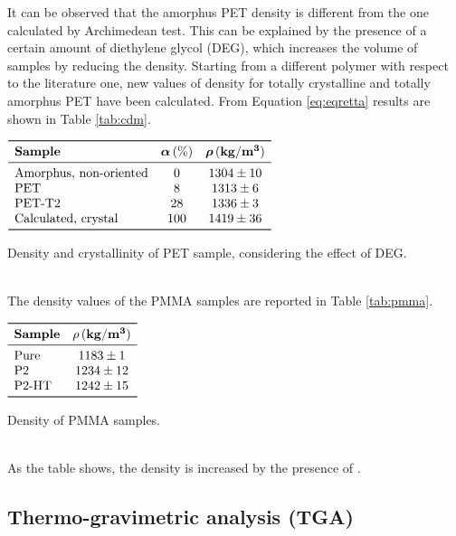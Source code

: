 \documentclass[a4paper, 11pt]{article}
\begin{document}
It can be observed that the amorphus PET density is different from the one calculated by Archimedean test. This can be explained by the presence of a certain amount of diethylene glycol (DEG), which increases the volume of samples by reducing the density. Starting from a different polymer with respect to the literature one, new values of density for totally crystalline and totally amorphus PET have been calculated. From Equation \ref{eq:eqretta} results are shown in Table \ref{tab:cdm}.
\begin{table}[htp]
\centering
$
\begin{array}{lcc}
\toprule
\textbf{Sample} & \boldsymbol{\alpha}\,(\%) & \boldsymbol{\rho}\,(\mathbf{kg/m^{3}})\\
\midrule
\text{Amorphus, non-oriented} & 0 & 1304 \pm 10\\
\text{PET} & 8 & 1313 \pm 6\\
\text{PET-T2} & 28 & 1336 \pm 3\\
\text{Calculated, crystal} & 100 & 1419 \pm 36\\
\bottomrule
\end{array}
$
\caption{Density and crystallinity of PET sample, considering the effect of DEG.}
\label{tab:cdm}
\end{table}\\
The density values of the PMMA samples are reported in Table \ref{tab:pmma}.
\begin{table}[htp]
\centering
$
\begin{array}{lc}
\toprule
\textbf{Sample} & \mathbf{\rho}\,(\mathbf{kg/m^{3}})\\
\midrule
\text{Pure} & 1183 \pm 1\\
\text{P2} & 1234 \pm 12\\
\text{P2-HT} & 1242 \pm 15\\
\bottomrule
\end{array}
$
\caption{Density of PMMA samples.}
\label{tab:pmma}
\end{table}\\
As the table shows, the density is increased by the presence of .

\newpage

\subsection{Thermo-gravimetric analysis (TGA)}
\end{document}
